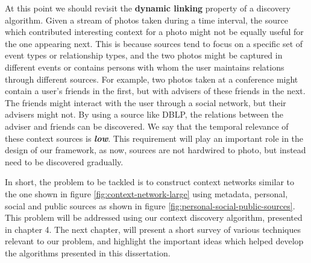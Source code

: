 At this point we should revisit the \textbf{dynamic linking} property of a discovery algorithm. Given a stream of photos taken during a time interval, the source which contributed interesting context for a photo might not be equally useful for the one appearing next. This is because sources tend to focus on a specific set of event types or relationship types, and the two photos might be captured in different events or contains persons with whom the user maintains relations through different sources. For example, two photos taken at a conference might contain a user's friends in the first, but with advisers of these friends in the next. The friends might interact with the user through a social network, but their advisers might not. By using a source like DBLP, the relations between the adviser and friends can be discovered. We say that the temporal relevance of these context sources is \textbf{\textit{low}}. This requirement will play an important role in the design of our framework, as now, sources are not hardwired to photo, but instead need to be discovered gradually.

In short, the problem to be tackled is to construct context networks similar to the one shown in figure \ref{fig:context-network-large} using metadata, personal, social and public sources as shown in figure \ref{fig:personal-social-public-sources}. This problem will be addressed using our context discovery algorithm, presented in chapter 4. The next chapter, will present a short survey of various techniques relevant to our problem, and highlight the important ideas which helped develop the algorithms presented in this dissertation.